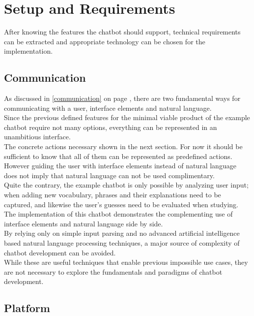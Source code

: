 \section{Setup and Requirements}


After knowing the features the chatbot should support,
technical requirements can be extracted
and appropriate technology can be chosen for the implementation.


\subsection{Communication}

As discussed in \ref{communication} on page \pageref{communication},
there are two fundamental ways for communicating with a user,
interface elements and natural language.
\\

Since the previous defined features for the minimal viable product of the example chatbot require not many options,
everything can be represented in an unambitious interface.
\\

The concrete actions necessary shown in the next section.
For now it should be sufficient to know that all of them can be represented as predefined actions.
\\
However guiding the user with interface elements instead of natural language
does not imply that natural language can not be used complimentary.
\\
Quite the contrary, the example chatbot is only possible by analyzing user input;
when adding new vocabulary, phrases and their explanations need to be captured,
and likewise the user's guesses need to be evaluated when studying.
\\

The implementation of this chatbot demonstrates the complementing use of interface elements and natural language side by side.
\\

By relying only on simple input parsing and no advanced artificial intelligence based natural language processing techniques,
a major source of complexity of chatbot development can be avoided.
\\
While these are useful techniques that enable previous impossible use cases,
they are not necessary to explore the fundamentals and paradigms of chatbot development.
\\

\subsection{Platform}

